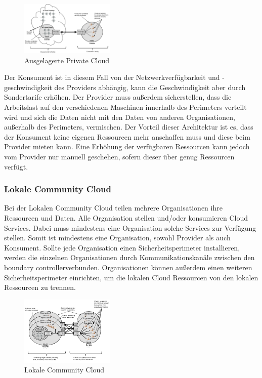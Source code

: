 \begin{figure}[H]
    \centering
	\includegraphics[width=0.4\textwidth]{Images/OutSourcedPrivateCloud}
	\caption{Ausgelagerte Private Cloud \cite{Badger}}
	\label{OutSourcedPrivateCloud}
\end{figure}

Der Konsument ist in diesem Fall von der Netzwerkverfügbarkeit und -geschwindigkeit des Providers abhängig, kann die Geschwindigkeit aber durch Sondertarife erhöhen.
Der Provider muss außerdem sicherstellen, dass die Arbeitslast auf den verschiedenen Maschinen innerhalb des Perimeters verteilt wird und sich die Daten 
nicht mit den Daten von anderen Organisationen, außerhalb des Perimeters, vermischen.
Der Vorteil dieser Architektur ist es, dass der Konsument keine eigenen Ressourcen mehr anschaffen muss und diese beim Provider mieten kann.
Eine Erhöhung der verfügbaren Ressourcen kann jedoch vom Provider nur manuell geschehen, sofern dieser über genug Ressourcen verfügt. 

\subsubsection{Lokale Community Cloud}

Bei der Lokalen Community Cloud teilen mehrere Organisationen ihre Ressourcen und Daten. Alle Organisation stellen und/oder konsumieren Cloud Services.
Dabei muss mindestens eine Organisation solche Services zur Verfügung stellen. Somit ist mindestens eine Organisation, sowohl Provider als auch Konsument.
Sollte jede Organisation einen Sicherheitsperimeter installieren, werden die einzelnen Organisationen durch Kommunikationskanäle zwischen den \glqq boundary controller\grqq verbunden.
Organisationen können außerdem einen weiteren Sicherheitsperimeter einrichten, um die lokalen Cloud Ressourcen von den lokalen Ressourcen zu trennen.

\begin{figure}[H]
    \centering
	\includegraphics[width=0.4\textwidth]{Images/On-siteCommunityCloud}
	\caption{Lokale Community Cloud \cite{Badger}}
	\label{On-siteCommunityCloud}
\end{figure}

